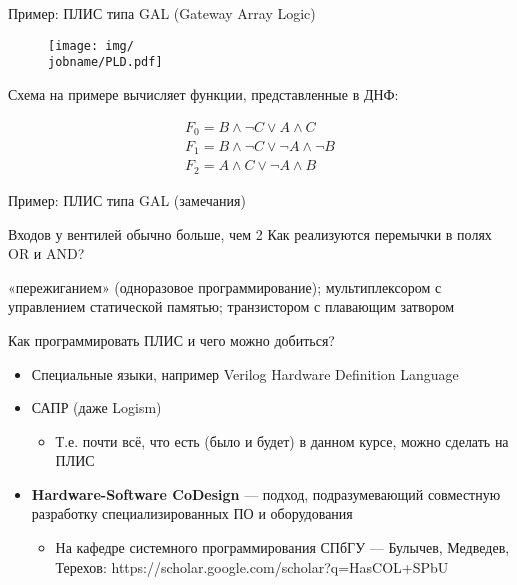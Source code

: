 \documentclass[xetex,aspectratio=43]{beamer}
\begin{document}
\begin{frame}{Пример: ПЛИС типа GAL (Gateway Array Logic)}
    \begin{figure}
        \texttt{[image: img/\\jobname/PLD.pdf]}
    \end{figure}
    Схема на примере вычисляет функции, представленные в ДНФ:

    \begin{eqnarray*}
    F_0 = B \wedge\neg C \vee A\wedge C\ \\
    F_1 = B \wedge\neg C \vee \neg A \wedge \neg B \\
    F_2 = A\wedge C \vee \neg A \wedge B
    \end{eqnarray*}
\end{frame}

\begin{frame}{Пример: ПЛИС типа GAL (замечания)}
    \begin{outline}[itemize]
        \1 Входов у вентилей обычно больше, чем 2
        \1 Как реализуются перемычки в полях OR и AND?

        \2 «пережиганием» (одноразовое программирование); мультиплексором с управлением статической памятью; транзистором с плавающим затвором
    \end{outline}
\end{frame}

\begin{frame}{Как программировать ПЛИС и чего можно добиться?}
        \begin{itemize}
            \tightlist
            \item
            Специальные языки, например Verilog Hardware Definition Language
            \item
            САПР (даже Logism)

            \begin{itemize}
                \tightlist
                \item
                Т.е. почти всё, что есть (было и будет) в данном курсе, можно
                сделать на ПЛИС
            \end{itemize}
            \item
            \textbf{Hardware-Software CoDesign} --- подход, подразумевающий
            совместную разработку специализированных ПО и оборудования

            \begin{itemize}
                \tightlist
                \item
                На кафедре системного программирования СПбГУ --- Булычев, Медведев,
                Терехов: https://scholar.google.com/scholar?q=HasCOL+SPbU
            \end{itemize}
        \end{itemize}
\end{frame}
\end{document}
